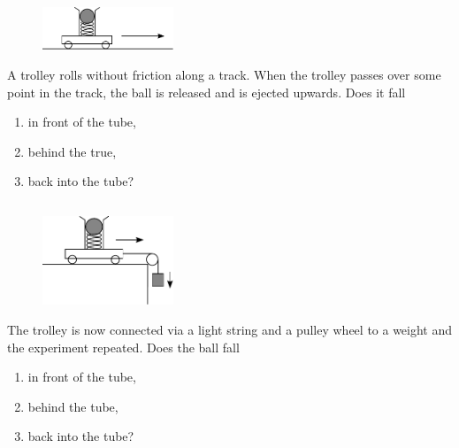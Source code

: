 	\subsection{}
		\begin{figure}
		  \vspace{-20pt}
		  \begin{center}
		  	\includegraphics[width=0.35\textwidth]{trolley1.pdf}
		  \end{center}
		  \vspace{-20pt}
		\end{figure}
		A trolley rolls without friction along a track. When the trolley passes over some point in the track, the ball is released and is ejected upwards. Does it fall 
		\begin{enumerate}[label=\alph*)]
			\item in front of the tube,
			\item behind the true,
			\item back into the tube?
		\end{enumerate}

	\subsection{}
		\begin{figure}
		  \vspace{-20pt}
		  \begin{center}
		  	\includegraphics[width=0.35\textwidth]{trolley2.pdf}
		  \end{center}
		  \vspace{-20pt}
		\end{figure}
		The trolley is now connected via a light string and a pulley wheel to a weight and the experiment repeated. Does the ball fall
		\begin{enumerate}[label=\alph*)]
			\item in front of the tube,
			\item behind the tube,
			\item back into the tube?
		\end{enumerate}

